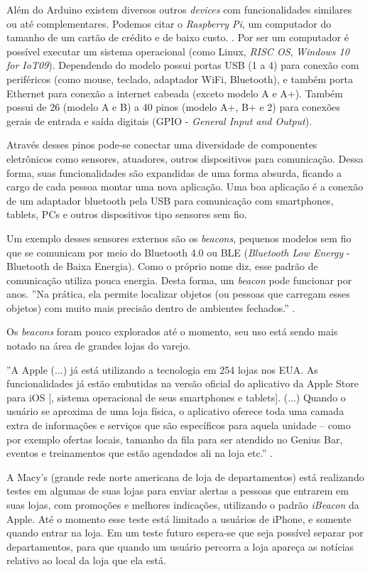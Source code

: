 Além do Arduino existem diversos outros \textit{devices} com funcionalidades similares ou até complementares. Podemos citar o \textit{Raspberry Pi}, um computador do tamanho de um cartão de crédito e de baixo custo. \cite{raspberrypi-rpi}. Por ser um computador é possível executar um sistema operacional (como Linux, \textit{RISC OS}, \textit{Windows 10 for IoT09}). Dependendo do modelo possui portas USB (1 a 4) para conexão com periféricos (como mouse, teclado, adaptador WiFi, Bluetooth), e também porta Ethernet para conexão a internet cabeada (exceto modelo A e A+). Também possui de 26 (modelo A e B) a 40 pinos (modelo A+, B+ e 2) para conexões gerais de entrada e saída digitais (GPIO - \textit{General Input and Output}). 

Através desses pinos pode-se conectar uma diversidade de componentes eletrônicos como sensores, atuadores, outros dispositivos para comunicação. Dessa forma, suas funcionalidades são expandidas de uma forma absurda, ficando a cargo de cada pessoa montar uma nova aplicação. Uma boa aplicação é a conexão de um adaptador bluetooth pela USB para comunicação com smartphones, tablets, PCs e outros dispositivos tipo sensores sem fio.

Um exemplo desses sensores externos são os \textit{beacons}, pequenos modelos sem fio que se comunicam por meio do Bluetooth 4.0 ou BLE (\textit{Bluetooth Low Energy} - Bluetooth de Baixa Energia). Como o próprio nome diz, esse padrão de comunicação utiliza pouca energia. Desta forma, um \textit{beacon} pode funcionar por anos. ''Na prática, ela permite localizar objetos (ou pessoas que carregam esses objetos) com muito mais precisão dentro de ambientes fechados.'' \cite{teixeira-beacon}.

Os \textit{beacons} foram pouco explorados até o momento, seu uso está sendo mais notado na área de grandes lojas do varejo.

\begin{citacao}
''A Apple (...) já está utilizando a tecnologia em 254 lojas nos EUA. As funcionalidades já estão embutidas na versão oficial do aplicativo da Apple Store para iOS [, sistema operacional de seus smartphones e tablets]. (...) Quando o usuário se aproxima de uma loja física, o aplicativo oferece toda uma camada extra de informações e serviços que são específicos para aquela unidade – como por exemplo ofertas locais, tamanho da fila para ser atendido no Genius Bar, eventos e treinamentos que estão agendados ali na loja etc.'' \cite{teixeira-beacon}.
\end{citacao}

A Macy's (grande rede norte americana de loja de departamentos) está realizando testes em algumas de suas lojas para enviar alertas a pessoas que entrarem em suas lojas, com promoções e melhores indicações, utilizando o padrão \textit{iBeacon} da Apple. Até o momento esse teste está limitado a usuários de iPhone, e somente quando entrar na loja. Em um teste futuro espera-se que seja possível separar por departamentos, para que quando um usuário percorra a loja apareça as notícias relativo ao local da loja que ela está. \cite{kastrenakes-macys-beacon}

